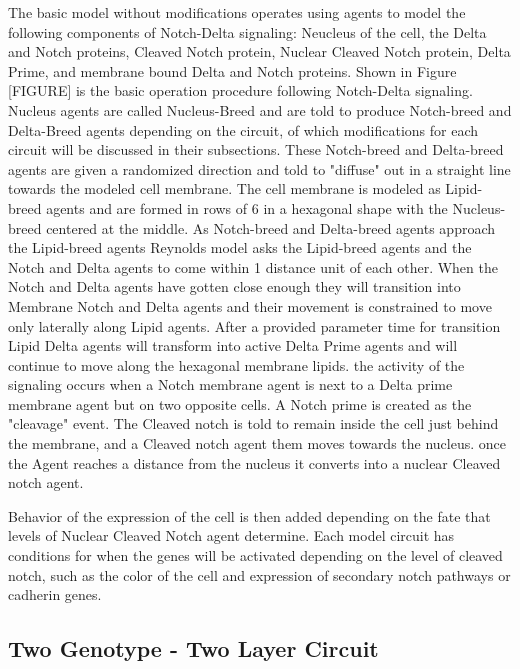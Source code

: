 The basic model without modifications operates using agents to model the following components of Notch-Delta signaling: Neucleus of the cell, the Delta and Notch proteins, Cleaved Notch protein, Nuclear Cleaved Notch protein, Delta Prime, and membrane bound Delta and Notch proteins. Shown in Figure [FIGURE] is the basic operation procedure following Notch-Delta signaling. Nucleus agents are called Nucleus-Breed and are told to produce Notch-breed and Delta-Breed agents depending on the circuit, of which modifications for each circuit will be discussed in their subsections. These Notch-breed and Delta-breed agents are given a randomized direction and told to "diffuse" out in a straight line towards the modeled cell membrane. The cell membrane is modeled as Lipid-breed agents and are formed in rows of 6 in a hexagonal shape with the Nucleus-breed centered at the middle. As Notch-breed and Delta-breed agents approach the Lipid-breed agents Reynolds model asks the Lipid-breed agents and the Notch and Delta agents to come within 1 distance unit of each other. When the Notch and Delta agents have gotten close enough they will transition into Membrane Notch and Delta agents and their movement is constrained to move only laterally along Lipid agents. After a provided parameter time for transition Lipid Delta agents will transform into active Delta Prime agents and will continue to move along the hexagonal membrane lipids. the activity of the signaling occurs when a Notch membrane agent is next to a Delta prime membrane agent but on two opposite cells. A Notch prime is created as the "cleavage" event. The Cleaved notch is told to remain inside the cell just behind the membrane, and a Cleaved notch agent them moves towards the nucleus. once the Agent reaches a distance from the nucleus it converts into a nuclear Cleaved notch agent. 

Behavior of the expression of the cell is then added depending on the fate that levels of Nuclear Cleaved Notch agent determine. Each model circuit has conditions for when the genes will be activated depending on the level of cleaved notch, such as the color of the cell and expression of secondary notch pathways or cadherin genes. 

\subsection{Two Genotype -  Two Layer Circuit}

